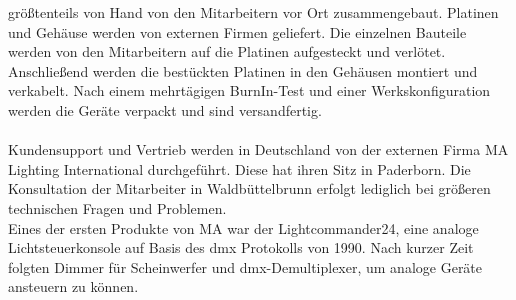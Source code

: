 \documentclass[11pt]{scrartcl}
\begin{document}
größtenteils von Hand von den Mitarbeitern vor Ort zusammengebaut. Platinen und Gehäuse werden
von externen Firmen geliefert. Die einzelnen Bauteile werden von den Mitarbeitern auf die
Platinen aufgesteckt und verlötet. Anschließend werden die bestückten Platinen in den Gehäusen
montiert und verkabelt. Nach einem mehrtägigen BurnIn-Test und einer Werkskonfiguration werden
die Geräte verpackt und sind versandfertig.\\
\\
Kundensupport und Vertrieb werden in Deutschland von der externen Firma MA Lighting International
durchgeführt. Diese hat ihren Sitz in Paderborn. Die Konsultation der Mitarbeiter in
Waldbüttelbrunn erfolgt lediglich bei größeren technischen Fragen und Problemen.\\
Eines der ersten Produkte von MA war der Lightcommander24, eine analoge Lichtsteuerkonsole auf
Basis des \ac{dmx} Protokolls von 1990. Nach kurzer Zeit folgten Dimmer für
Scheinwerfer und \ac{dmx}-Demultiplexer, um analoge Geräte ansteuern zu können.\\
\end{document}
